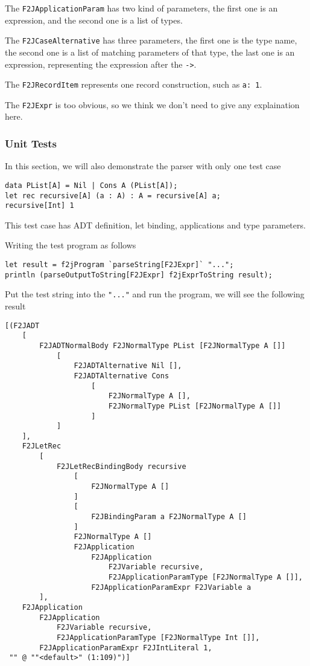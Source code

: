 The \texttt{F2JApplicationParam} has two kind of parameters, the first one is an expression, and the second one is a list of types.

The \texttt{F2JCaseAlternative} has three parameters, the first one is the type name, the second one is a list of matching parameters of that type, the last one is an expression, representing the expression after the \texttt{-\textgreater}.

The \texttt{F2JRecordItem} represents one record construction, such as \texttt{a: 1}.

The \texttt{F2JExpr} is too obvious, so we think we don't need to give any explaination here.

\subsubsection{Unit Tests}

In this section, we will also demonstrate the parser with only one test case

\begin{lstlisting}
data PList[A] = Nil | Cons A (PList[A]);
let rec recursive[A] (a : A) : A = recursive[A] a;
recursive[Int] 1
\end{lstlisting}

This test case has ADT definition, let binding, applications and type parameters.

Writing the test program as follows

\begin{lstlisting}
let result = f2jProgram `parseString[F2JExpr]` "...";
println (parseOutputToString[F2JExpr] f2jExprToString result);
\end{lstlisting}

Put the test string into the \texttt{"..."} and run the program, we will see the following result

\begin{lstlisting}
[(F2JADT
    [
        F2JADTNormalBody F2JNormalType PList [F2JNormalType A []]
            [
                F2JADTAlternative Nil [],
                F2JADTAlternative Cons
                    [
                        F2JNormalType A [],
                        F2JNormalType PList [F2JNormalType A []]
                    ]
            ]
    ],
    F2JLetRec
        [
            F2JLetRecBindingBody recursive
                [
                    F2JNormalType A []
                ]
                [
                    F2JBindingParam a F2JNormalType A []
                ]
                F2JNormalType A []
                F2JApplication
                    F2JApplication
                        F2JVariable recursive,
                        F2JApplicationParamType [F2JNormalType A []],
                    F2JApplicationParamExpr F2JVariable a
        ],
    F2JApplication
        F2JApplication
            F2JVariable recursive,
            F2JApplicationParamType [F2JNormalType Int []],
        F2JApplicationParamExpr F2JIntLiteral 1,
 "" @ ""<default>" (1:109)")]
\end{lstlisting}

